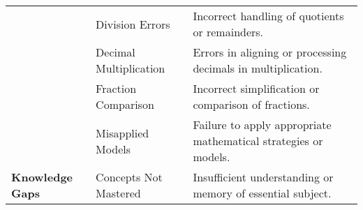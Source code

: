 \begin{table}[htbp]
{\begin{tabular}{|p{3cm}|p{3cm}|p{8cm}|}
& {Division Errors} & Incorrect handling of quotients or remainders. \\ \cline{2-3}
& {Decimal Multiplication} & Errors in aligning or processing decimals in multiplication. \\ \cline{2-3}
& {Fraction Comparison} & Incorrect simplification or comparison of fractions. \\
\cline{2-3}
& {Misapplied Models} & Failure to apply appropriate mathematical strategies or models. \\\hline
\multirow{1}{4cm}{\textbf{Knowledge Gaps}} & Concepts Not Mastered & Insufficient understanding or memory of essential subject. \\ \hline
\end{tabular}%
}

\end{table}









